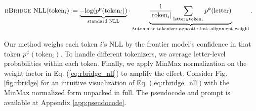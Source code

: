 \begin{equation}\label{eq:rbridge_nll}
    \text{\textsc{rBridge} NLL}(\text{token}_i):=  \underbrace{-\text{log}(p^\text{p}(\text{token}_i))}_{\text{standard NLL}} \cdot 
    \underbrace{\frac{1}{\vert \text{token}_i \vert} \sum_{\text{letter} \in \text{token}_i} p^\phi(\text{letter})}_{\text{Automatic tokenizer-agnostic task-alignment weight}
    }.
\end{equation}

Our method weighs each token $i$'s NLL by the frontier model's confidence in that token $p^\phi(\text{token}_i)$. To handle different tokenizers, we average letter-level probabilities within each token. Finally, we apply MinMax normalization \citep{witten2002data} on the weight factor in Eq. (\ref{eq:rbridge_nll}) to amplify the effect. Consider Fig. \ref{fig:rbridge} for an intuitive visualization of Eq. (\ref{eq:rbridge_nll}) with the MinMax normalized form unpacked in full. The pseudocode and prompt is available at Appendix \ref{app:pseudocode}.







